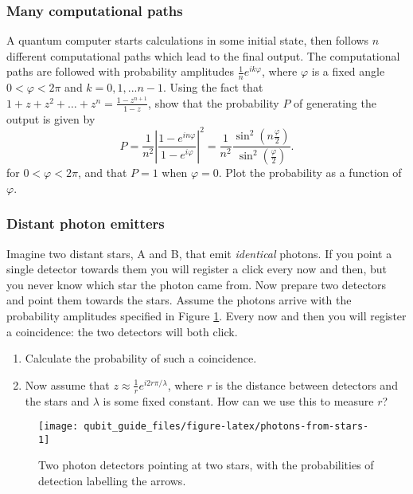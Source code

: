 \documentclass[fleqn]{article}
\providecommand{\tightlist}{%
  \setlength{\itemsep}{0pt}\setlength{\parskip}{0pt}}
\begin{document}
\hypertarget{many-computational-paths}{%
\subsubsection{Many computational paths}\label{many-computational-paths}}

A quantum computer starts calculations in some initial state, then follows \(n\) different computational paths which lead to the final output.
The computational paths are followed with probability amplitudes \(\frac{1}{n}e^{i k \varphi}\), where \(\varphi\) is a fixed angle \(0< \varphi <2\pi\) and \(k=0,1,...n-1\).
Using the fact that \(1+z+z^2+\ldots + z^n= \frac{1-z^{n+1}}{1-z}\), show that the probability \(P\) of generating the output is given by
\[
  P
  = \frac{1}{n^2}\left\vert
    \frac{1-e^{i n\varphi}}{1-e^{i\varphi}}
  \right\vert^2
  = \frac{1}{n^2} \frac{\sin^2 (n\frac{\varphi}{2})}{\sin^2 (\frac{\varphi}{2})}.
\]
for \(0<\varphi<2\pi\), and that \(P=1\) when \(\varphi=0\).
Plot the probability as a function of \(\varphi\).

\hypertarget{distant-photon-emitters}{%
\subsubsection{Distant photon emitters}\label{distant-photon-emitters}}

Imagine two distant stars, A and B, that emit \emph{identical} photons.
If you point a single detector towards them you will register a click every now and then, but you never know which star the photon came from.
Now prepare two detectors and point them towards the stars.
Assume the photons arrive with the probability amplitudes specified in Figure \ref{fig:photons-from-stars}.
Every now and then you will register a coincidence: the two detectors will both click.

\begin{enumerate}
\def\labelenumi{\alph{enumi}.}
\tightlist
\item
  Calculate the probability of such a coincidence.
\item
  Now assume that \(z\approx \frac{1}{r}e^{i{2r\pi}/{\lambda}}\), where \(r\) is the distance between detectors and the stars and \(\lambda\) is some fixed constant. How can we use this to measure \(r\)?
\end{enumerate}

\begin{figure}[H]

{\centering \texttt{[image: qubit\_guide\_files/figure-latex/photons-from-stars-1]} 

}

\caption{Two photon detectors pointing at two stars, with the probabilities of detection labelling the arrows.}\label{fig:photons-from-stars}
\end{figure}
\end{document}

